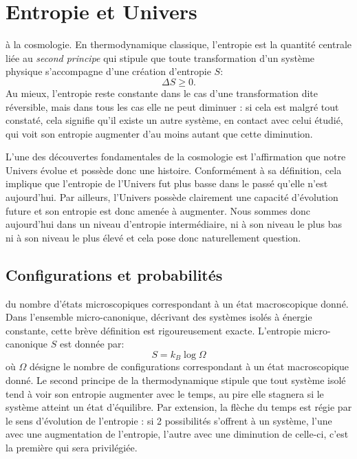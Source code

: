 \chapter{Entropie et Univers}
 à la cosmologie. En thermodynamique classique, l'entropie est la quantité centrale liée au \textit{second principe} qui stipule que toute transformation d'un système physique s'accompagne d'une création d'entropie $S$:
\begin{equation}
\Delta S \ge 0.
\end{equation}
Au mieux, l'entropie reste constante dans le cas d'une transformation dite réversible, mais dans tous les cas elle ne peut diminuer : si cela est malgré tout constaté, cela signifie qu'il existe un autre système, en contact avec celui étudié, qui voit son entropie augmenter d'au moins autant que cette diminution. 

L'une des découvertes fondamentales de la cosmologie est l'affirmation que notre Univers évolue et possède donc une histoire. Conformément à sa définition, cela implique que l'entropie de l'Univers fut plus basse dans le passé qu'elle n'est aujourd'hui. Par ailleurs, l'Univers possède clairement une capacité d'évolution future et son entropie est donc amenée à augmenter. Nous sommes donc aujourd'hui dans un niveau d'entropie intermédiaire, ni à son niveau le plus bas ni à son niveau le plus élevé et cela pose donc naturellement question.

\section{Configurations et probabilités}
 du nombre d'états microscopiques correspondant à un état macroscopique donné. Dans l'ensemble micro-canonique, décrivant des systèmes isolés à énergie constante, cette brève définition est rigoureusement exacte. L'entropie micro-canonique $S$ est donnée par:
\begin{equation}
S=k_B\log \Omega
\end{equation}
où $\Omega$ désigne le nombre de configurations correspondant à un état macroscopique donné. Le second principe de la thermodynamique stipule que tout système isolé tend à voir son entropie augmenter avec le temps, au pire elle stagnera si le système atteint un état d'équilibre. Par extension, la flèche du temps est régie par le sens d'évolution de l'entropie : si 2 possibilités s'offrent à un système, l'une avec une augmentation de l'entropie, l'autre avec une diminution de celle-ci, c'est la première qui sera privilégiée.

